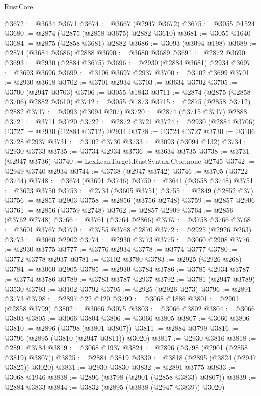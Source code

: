 \begin{lexlean}{RustCore}
\begin{coremodule}
@3672 := @3634 @3671
@3674 := @3667 (@2947 @3672)
@3675 := @3055 @1524
@3680 := @2874 (@2875 (@2858 @3675) @2882 @3610)
@3681 := @3055 @1640
@3684 := @2875 (@2858 @3681) @2882
@3686 := @3093 (@3094 @198)
@3689 := @2874 (@3684 @3686) @2888
@3690 := @3680 @3689
@3691 := @2872 @3690
@3693 := @2930 (@2884 @3675)
@3696 := @2930 (@2884 @3681) @2934
@3697 := @3693 @3696
@3699 := @3106 @3697 @2937
@3700 := @3102 @3699
@3701 := @2930 @3618
@3702 := @3701 @2934
@3703 := @3634 @3702
@3705 := @3700 (@2947 @3703)
@3706 := @3055 @1843
@3711 := @2874 (@2875 (@2858 @3706) @2882 @3610)
@3712 := @3055 @1873
@3715 := @2875 (@2858 @3712) @2882
@3717 := @3093 (@3094 @207)
@3720 := @2874 (@3715 @3717) @2888
@3721 := @3711 @3720
@3722 := @2872 @3721
@3724 := @2930 (@2884 @3706)
@3727 := @2930 (@2884 @3712) @2934
@3728 := @3724 @3727
@3730 := @3106 @3728 @2937
@3731 := @3102 @3730
@3733 := @3093 (@3094 @132)
@3734 := @2930 @3733
@3735 := @3734 @2934
@3736 := @3634 @3735
@3738 := @3731 (@2947 @3736)
@3740 := LexLeanTarget.RustSyntax.Ctor.none @2745
@3742 := @2949 @3740 @2934
@3744 := @3738 (@2947 @3742)
@3746 := @3705 (@3722 @3744)
@3748 := @3674 (@3691 @3746)
@3750 := @3641 (@3658 @3748)
@3751 := @3623 @3750
@3753 := @2734 (@3605 @3751)
@3755 := @2849 (@2852 @37)
@3756 := @2857 @2903
@3758 := @2856 (@3756 @2748)
@3759 := @2857 @2906
@3761 := @2856 (@3759 @2748)
@3762 := @2857 @2909
@3764 := @2856 (@3762 @2748)
@3766 := @3761 (@3764 @2866)
@3767 := @3758 @3766
@3768 := @3601 @3767
@3770 := @3755 @3768 @2870
@3772 := @2925 (@2926 @263)
@3773 := @3060 @2902
@3774 := @2930 @3773
@3775 := @3060 @2908
@3776 := @2930 @3775
@3777 := @3776 @2934
@3778 := @3774 @3777
@3780 := @3772 @3778 @2937
@3781 := @3102 @3780
@3783 := @2925 (@2926 @268)
@3784 := @3060 @2905
@3785 := @2930 @3784
@3786 := @3785 @2934
@3787 := @3774 @3786
@3789 := @3783 @3787 @2937
@3792 := @3781 (@2947 @3789) @3530
@3793 := @3102 @3792
@3795 := @2925 (@2926 @273)
@3796 := @2891 @3773
@3798 := @2897 @22 @120
@3799 := @3068 @1886
@3801 := @2901 (@2858 @3799)
@3802 := @3066 @3075
@3803 := @3066 @3802
@3804 := @3066 @3803
@3805 := @3066 @3804
@3806 := @3066 @3805
@3807 := @3066 @3806
@3810 := @2896 (@3798 (@3801 @3807))
@3811 := @2884 @3799
@3816 := @3796 (@2895 (@3810 (@2947 @3811)) @3020)
@3817 := @2930 @3816
@3818 := @2891 @3784
@3819 := @3068 @1937
@3824 := @2896 (@3798 (@2901 (@2858 @3819) @3807))
@3825 := @2884 @3819
@3830 := @3818 (@2895 (@3824 (@2947 @3825)) @3020)
@3831 := @2930 @3830
@3832 := @2891 @3775
@3833 := @3068 @1946
@3838 := @2896 (@3798 (@2901 (@2858 @3833) @3807))
@3839 := @2884 @3833
@3844 := @3832 (@2895 (@3838 (@2947 @3839)) @3020)

\end{coremodule}
\end{lexlean}
